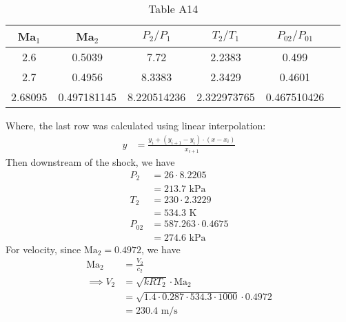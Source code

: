 \begin{table}[H]
    \centering
    \caption{Table A14}
    \begin{tabular}{cccccc}
        \toprule
        Ma$_1$ & Ma$_2$ & $P_2/P_1$ & $T_2/T_1$ & $P_{02}/P_{01}$ \\
        \midrule
        2.6 & 0.5039 & 7.72 & 2.2383 & 0.499 \\
        2.7 & 0.4956 & 8.3383 & 2.3429 & 0.4601 \\
        \midrule
        2.68095 & 0.497181145 & 8.220514236 & 2.322973765 & 0.467510426 \\
        \bottomrule
    \end{tabular}
\end{table}
Where, the last row was calculated using linear interpolation:
\begin{align*}
    y &= \frac{y_i + (y_{i+1} - y_i) \cdot (x - x_i)}{x_{i+1}} 
\end{align*}
Then downstream of the shock, we have
\begin{align*}
    P_2 &= 26 \cdot 8.2205 \\
    &= \boxed{213.7 \text{ kPa}} \\
    T_2 &= 230 \cdot 2.3229 \\ 
    &= \boxed{534.3 \text{ K}} \\
    P_{02} &= 587.263 \cdot 0.4675 \\
    &= \boxed{274.6 \text{ kPa}} 
\end{align*}
For velocity, since $\text{Ma}_2 = 0.4972$, we have
\begin{align*}
    \text{Ma}_2 &= \frac{V_2}{c_2} \\
    \implies V_2 &= \sqrt{kRT_2} \cdot \text{Ma}_2 \\
    &= \sqrt{1.4 \cdot 0.287 \cdot 534.3 \cdot 1000} \cdot 0.4972 \\
    &= \boxed{230.4 \text{ m/s}}
\end{align*}


    
